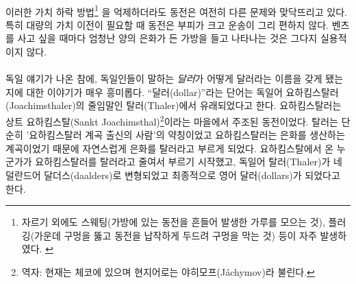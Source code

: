 \paragraph{}
\begin{comment}
	Even with these methods of coin debasement\footnote{Besides clipping, sweating
		(shaking the coins in a bag and collecting the dust worn off) and plugging
		(punching a hole in the middle and hammering the coin flat to close the hole)
		were the most prominent methods of coin debasement. \cite{wiki:coin-debasement}}
	kept in check, coins still suffer from other issues. They are bulky and not very
	convenient to transport, especially when large transfers of value need to
	happen. Showing up with a huge bag of silver dollars every time you want to buy
	a Mercedes isn't very practical.
\end{comment}
이러한 가치 하락 방법\footnote{자르기 외에도 스웨팅(가방에 있는 동전을 흔들어 발생한 가루를 모으는 것),
	플러깅(가운데 구멍을 뚫고 동전을 납작하게 두드려 구멍을 막는 것) 등이 자주 발생하였다.
	\cite{wiki:coin-debasement}}
을 억제하더라도 동전은 여전히 다른 문제와 맞닥뜨리고 있다. 
특히 대량의 가치 이전이 필요할 때 동전은 부피가 크고 운송이 그리 편하지 않다.
벤츠를 사고 싶을 때마다 엄청난 양의 은화가 든 가방을 들고 나타나는 것은 그다지 실용적이지 않다.

\paragraph{}
\begin{comment}
	Speaking of German things: How the United States \textit{dollar} got its name is
	another interesting story. The word \enquote{dollar} is derived from the German word
	\textit{Thaler}, short for a \textit{Joachimsthaler}~\cite{wiki:thaler}. A
	Joachimsthaler was a coin minted in the town of \textit{Sankt Joachimsthal}.
	Thaler is simply a shorthand for someone (or something) coming from the valley,
	and because Joachimsthal was \textit{the} valley for silver coin production,
	people simply referred to these silver coins as \textit{Thaler.} Thaler (German)
	morphed into daalders (Dutch), and finally dollars (English).
\end{comment}
독일 얘기가 나온 참에, 독일인들이 말하는 \textit{달러}가 어떻게 달러라는 이름을 갖게 됐는지에 대한 이야기가 매우 흥미롭다.
\enquote{달러(dollar)}라는 단어는 독일어 요하킴스탈러(Joachimsthaler)의 줄임말인 탈러(Thaler)에서 유래되었다고 한다\cite{wiki:thaler}. 
요하킴스탈러는 상트 요하킴스탈(Sankt Joachimsthal)\footnote{역자: 현재는 체코에 있으며 현지어로는 야히모프(Jáchymov)라 불린다.}이라는 마을에서 주조된 동전이었다.
탈러는 단순히 '요하킴스탈러 계곡 출신의 사람'의 약칭이었고 요하킴스탈러는 은화를 생산하는 계곡이었기 때문에 자연스럽게 은화를 탈러라고 부르게 되었다. 
요하킴스탈에서 온 누군가가 요하킴스탈러를 탈러라고 줄여서 부르기 시작했고, 
독일어 탈러(Thaler)가 네덜란드어 달더스(daalders)로 변형되었고 최종적으로 영어 달러(dollars)가 되었다고 한다.

